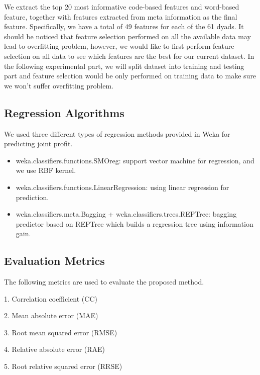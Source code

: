 \documentclass[11pt]{article} %
\begin{document}
We extract the top 20 most informative code-based features and word-based feature, together with features extracted from meta information as the final feature. Specifically, we have a total of 49 features for each of the 61 dyads. It should be noticed that feature selection performed on all the available data may lead to overfitting problem, however, we would like to first perform feature selection on all data to see which features are the best for our current dataset. In the following experimental part, we will split dataset into training and testing part and feature selection would be only performed on training data to make sure we won't suffer overfitting problem.

\subsection{Regression Algorithms}
We used three different types of regression methods provided in Weka for predicting joint profit.
\begin{itemize}
\item weka.classifiers.functions.SMOreg: support vector machine for regression, and we use RBF kernel.
\item weka.classifiers.functions.LinearRegression: using linear regression for prediction.
\item weka.classifiers.meta.Bagging + weka.classifiers.trees.REPTree: bagging predictor based on REPTree which builds a regression tree using information gain.
\end{itemize}

\subsection{Evaluation Metrics}
The following metrics are used to evaluate the proposed method.

1. Correlation coefficient (CC)

2. Mean absolute error (MAE)

3. Root mean squared error (RMSE)

4. Relative absolute error (RAE)

5. Root relative squared error (RRSE)
\end{document}
